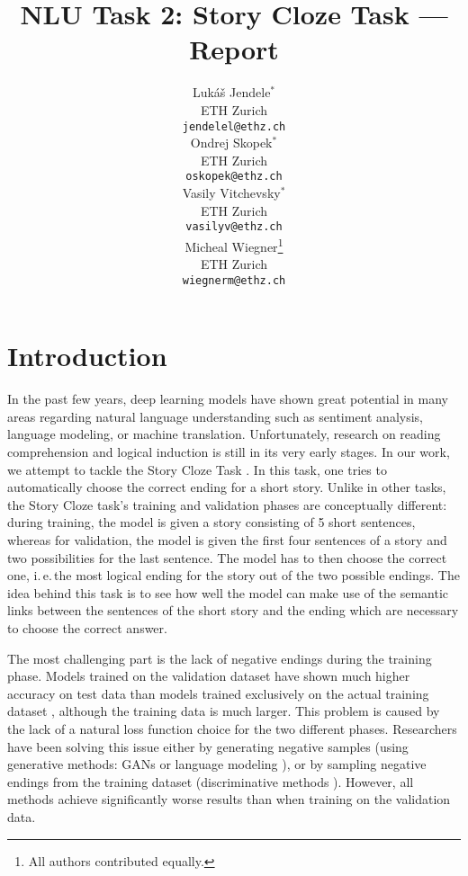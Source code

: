 \documentclass{article}
\title{NLU Task 2: Story Cloze Task --- Report}
\author{
  Luk\'{a}\v{s} Jendele$^\ast$\\
  ETH Zurich\\
  \texttt{jendelel@ethz.ch}\\
  \And
  Ondrej Skopek$^\ast$\\
  ETH Zurich\\
  \texttt{oskopek@ethz.ch}\\
  \And
  Vasily Vitchevsky$^\ast$\\
  ETH Zurich\\
  \texttt{vasilyv@ethz.ch}\\
  \And
  Micheal Wiegner\thanks{All authors contributed equally.}\\
  ETH Zurich\\
  \texttt{wiegnerm@ethz.ch}\\
}
\begin{document}
\maketitle


\section{Introduction}\label{sec:intro}
In the past few years, deep learning models have shown great potential in many areas regarding natural language understanding such as sentiment analysis, language modeling, or machine translation. Unfortunately, research on reading comprehension and logical induction is still in its very early stages. In our work, we attempt to tackle the Story Cloze Task \citep{Mostafazadeh2016AStories}. In this task, one tries to automatically choose the correct ending for a short story. Unlike in other tasks, the Story Cloze task's training and validation phases are conceptually different: during training, the model is given a story consisting of 5 short sentences, whereas for validation, the model is given the first four sentences of a story and two possibilities for the last sentence. The model has to then choose the correct one, i.\,e.\,the most logical ending for the story out of the two possible endings. The idea behind this task is to see how well the model can make use of the semantic links between the sentences of the short story and the ending which are necessary to choose the correct answer.

The most challenging part is the lack of negative endings during the training phase. Models trained on the validation dataset \citep{Srinivasan2018ATest,Roemmele2017AnTest} have shown much higher accuracy on test data than models trained exclusively on the actual training dataset \citep{Roemmele2017AnTest,Wang2017ConditionalComprehension}, although the training data is much larger. This problem is caused by the lack of a natural loss function choice for the two different phases. Researchers have been solving this issue either by generating negative samples (using generative methods: GANs \citep{Wang2017ConditionalComprehension} or language modeling \citep{Roemmele2017AnTest}), or by sampling negative endings from the training dataset (discriminative methods \citep{Roemmele2017AnTest}). However, all methods achieve significantly worse results than when training on the validation data.
\end{document}
